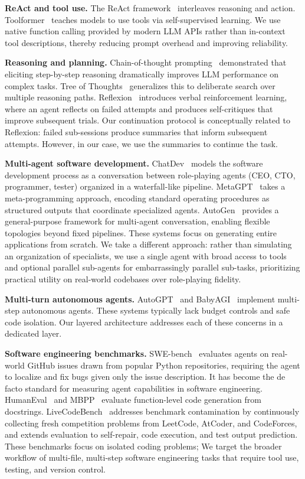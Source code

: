 \documentclass{article}
\begin{document}
\textbf{ReAct and tool use.} The ReAct framework~\citep{yao2023react} interleaves reasoning and action. Toolformer~\citep{schick2023toolformer} teaches models to use tools via self-supervised learning.  We use native function calling provided by modern LLM APIs rather than in-context tool descriptions, thereby reducing prompt overhead and improving reliability.

\textbf{Reasoning and planning.} Chain-of-thought prompting~\citep{wei2022chain} demonstrated that eliciting step-by-step reasoning dramatically improves LLM performance on complex tasks.  Tree of Thoughts~\citep{yao2023tree} generalizes this to deliberate search over multiple reasoning paths. Reflexion~\citep{shinn2023reflexion} introduces verbal reinforcement learning, where an agent reflects on failed attempts and produces self-critiques that improve subsequent trials.  Our continuation protocol is conceptually related to Reflexion: failed sub-sessions produce summaries that inform subsequent attempts. However, in our case, we use the summaries to continue the task.

\textbf{Multi-agent software development.} ChatDev~\citep{qian2024chatdev} models the software development process as a conversation between role-playing agents (CEO, CTO, programmer, tester) organized in a waterfall-like pipeline. MetaGPT~\citep{hong2024metagpt} takes a meta-programming approach, encoding standard operating procedures as structured outputs that coordinate specialized agents. AutoGen~\citep{wu2023autogen} provides a general-purpose framework for multi-agent conversation, enabling flexible topologies beyond fixed pipelines.  These systems focus on generating entire applications from scratch.  We take a different approach: rather than simulating an organization of specialists, we use a single agent with broad access to tools and optional parallel sub-agents for embarrassingly parallel sub-tasks, prioritizing practical utility on real-world codebases over role-playing fidelity.

\textbf{Multi-turn autonomous agents.} AutoGPT~\citep{autogpt2023} and BabyAGI~\citep{babyagi2023} implement multi-step autonomous agents.  These systems typically lack budget controls and safe code isolation.  Our layered architecture addresses each of these concerns in a dedicated layer.

\textbf{Software engineering benchmarks.} SWE-bench~\citep{jimenez2024swebench} evaluates agents on real-world GitHub issues drawn from popular Python repositories, requiring the agent to localize and fix bugs given only the issue description. It has become the de facto standard for measuring agent capabilities in software engineering. HumanEval~\citep{chen2021evaluating} and MBPP~\citep{austin2021program} evaluate function-level code generation from docstrings. LiveCodeBench~\citep{jain2024livecodebench} addresses benchmark contamination by continuously collecting fresh competition problems from LeetCode, AtCoder, and CodeForces, and extends evaluation to self-repair, code execution, and test output prediction.  These benchmarks focus on isolated coding problems; We target the broader workflow of multi-file, multi-step software engineering tasks that require tool use, testing, and version control.
\end{document}
